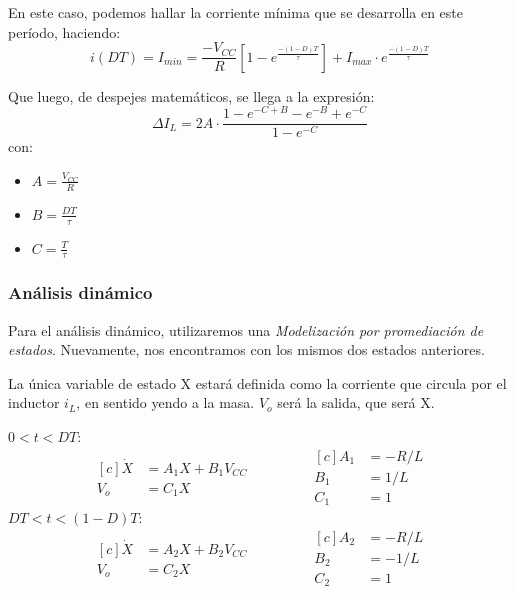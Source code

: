 \documentclass[titlepage, 12pt]{article}
\begin{document}
En este caso, podemos hallar la corriente mínima que se desarrolla en este período, haciendo:
  \[
    i(DT) = I_{min} = \frac{-V_{CC}}{R} \left[1 - e^\frac{-(1-D)T}{\tau}\right] + I_{max} \cdot e^\frac{-(1-D)T}{\tau}
  \]

Que luego, de despejes matemáticos, se llega a la expresión:
\[
    \boxed{
        \Delta I_L = 2A \cdot \frac{1 - e^{-C+B} - e^{-B} + e^{-C}}{1 - e^{-C}}
    }
\]
con:
    \begin{itemize}
        \item $A = \frac{V_{CC}}{R}$ 
        \item $B = \frac{DT}{\tau}$
        \item $C = \frac{T}{\tau}$
    \end{itemize}

\subsubsection{Análisis dinámico}
Para el análisis dinámico, utilizaremos una \textit{Modelización por promediación de estados}. Nuevamente, nos encontramos con los mismos dos estados anteriores.

La única variable de estado X estará definida como la corriente que circula por el inductor $i_L$, en sentido yendo a la masa. $V_o$ será la salida, que será X.

\underline{$0 < t < DT$}:
    \begin{equation*}
    \begin{aligned}[c]
        \Dot{X} &= A_1 X + B_1 V_{CC}\\
        V_o     &= C_1 X
    \end{aligned}
    \qquad\qquad
    \begin{aligned}[c]
        A_1&=-R/L\\
        B_1&=1/L\\
        C_1&=1
    \end{aligned}
    \end{equation*}
\underline{$DT < t < (1-D)T$}:
    \begin{equation*}
    \begin{aligned}[c]
        \Dot{X} &= A_2 X + B_2 V_{CC}\\
        V_o     &= C_2 X
    \end{aligned}
    \qquad\qquad
    \begin{aligned}[c]
        A_2&=-R/L\\
        B_2&=-1/L\\
        C_2&=1
    \end{aligned}
    \end{equation*}
\end{document}
